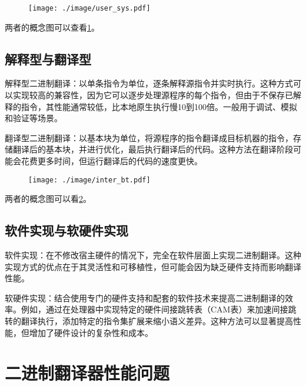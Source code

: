 \begin{figure}[!htbp]
  \centering
  \texttt{[image: ./image/user\_sys.pdf]}
  \label{img:user_sys}
\end{figure}

两者的概念图可以查看\ref{img:user_sys}。

\subsection{解释型与翻译型}
解释型二进制翻译：以单条指令为单位，逐条解释源指令并实时执行。这种方式可以实现较高的兼容性，因为它可以逐步处理源程序的每个指令，但由于不保存已解释的指令，其性能通常较低，比本地原生执行慢10到100倍。一般用于调试、模拟和验证等场景。

翻译型二进制翻译：以基本块为单位，将源程序的指令翻译成目标机器的指令，存储翻译后的基本块，并进行优化，最后执行翻译后的代码。这种方法在翻译阶段可能会花费更多时间，但运行翻译后的代码的速度更快。

\begin{figure}[h]
  \centering
  \texttt{[image: ./image/inter\_bt.pdf]}
  \label{img:inter_bt}
\end{figure}

两者的概念图可以看\ref{img:inter_bt}。

\subsection{软件实现与软硬件实现}
软件实现：在不修改宿主硬件的情况下，完全在软件层面上实现二进制翻译。这种实现方式的优点在于其灵活性和可移植性，但可能会因为缺乏硬件支持而影响翻译性能。

软硬件实现：结合使用专门的硬件支持和配套的软件技术来提高二进制翻译的效率。例如，通过在处理器中实现特定的硬件间接跳转表（CAM表）来加速间接跳转的翻译执行\cite{Godson3}，添加特定的指令集扩展来缩小语义差异\cite{LoongISA}。这种方法可以显著提高性能，但增加了硬件设计的复杂性和成本。

\section{二进制翻译器性能问题}

